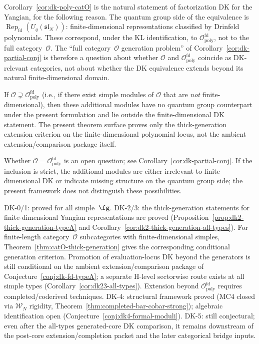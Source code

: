 \begin{remark}
\label{rem:poly-O-natural-domain}
Corollary~\ref{cor:dk-poly-catO} is the natural statement of
factorization DK for the Yangian, for the following reason.
The quantum group side of the equivalence is
$\operatorname{Rep}_{\mathrm{fd}}(U_q(\mathfrak{sl}_N))$: finite-dimensional
representations classified by Drinfeld polynomials. These correspond,
under the KL identification, to
$\mathcal{O}_{\mathrm{poly}}^{\mathrm{fd}}$, not to the full
category~$\mathcal{O}$.
The ``full category~$\mathcal{O}$ generation problem'' of
Corollary~\ref{cor:dk-partial-conj}
is therefore a question about whether
$\mathcal{O}$ and $\mathcal{O}_{\mathrm{poly}}^{\mathrm{fd}}$
coincide as DK-relevant categories, not about whether the DK
equivalence extends beyond its natural finite-dimensional domain.

If $\mathcal{O} \supsetneq
\mathcal{O}_{\mathrm{poly}}^{\mathrm{fd}}$ (i.e., if there exist
simple modules of $\mathcal{O}$ that are \emph{not}
finite-dimensional), then these additional modules have no quantum
group counterpart under the present formulation and lie outside the
finite-dimensional DK statement. The present theorem surface proves
only the thick-generation extension criterion on the finite-dimensional
polynomial locus, not the ambient extension/comparison package itself.

Whether $\mathcal{O} =
\mathcal{O}_{\mathrm{poly}}^{\mathrm{fd}}$ is an open question; see
Corollary~\ref{cor:dk-partial-conj}. If the inclusion is strict, the
additional modules are either irrelevant to finite-dimensional DK
or indicate missing structure on the quantum group side; the
present framework does not distinguish these possibilities.
\end{remark}

\begin{remark}
\label{rem:dk-fd-synthesis}
DK-0/1: proved for all simple~$\fg$. DK-2/3: the thick-generation
statements for finite-dimensional Yangian representations are proved
\textup{(}Proposition~\ref{prop:dk2-thick-generation-typeA} and
Corollary~\ref{cor:dk2-thick-generation-all-types}\textup{)}. For
finite-length category~$\mathcal O$ subcategories with
finite-dimensional simples, Theorem~\ref{thm:catO-thick-generation}
gives the corresponding conditional generation criterion. Promotion
of evaluation-locus DK beyond the generators is still conditional on
the ambient extension/comparison package of
Conjecture~\ref{conj:dk-fd-typeA}; a separate H-level sectorwise route
exists at all simple types
\textup{(}Corollary~\ref{cor:dk23-all-types}\textup{)}. Extension
beyond $\mathcal{O}_{\mathrm{poly}}^{\mathrm{fd}}$ requires
completed/coderived techniques. DK-4: structural framework proved
(MC4 closed via
$\mathcal{W}_N$ rigidity, Theorem~\ref{thm:completed-bar-cobar-strong});
algebraic identification open (Conjecture~\ref{conj:dk4-formal-moduli}).
DK-5: still conjectural; even after the all-types generated-core DK
comparison, it remains downstream of the post-core
extension/completion packet and the later categorical bridge inputs.
\end{remark}


